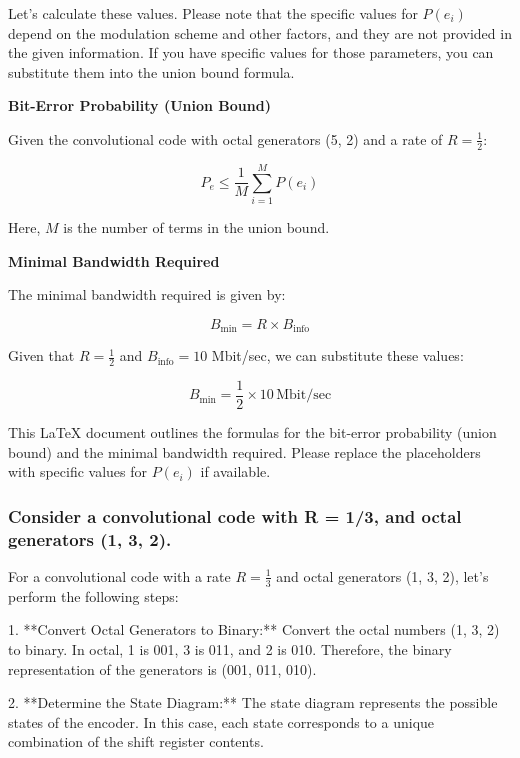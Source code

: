 \documentclass[colorlinks,11pt,a4paper,normalphoto,withhyper,ragged2e]{altareport}
\begin{document}
				Let's calculate these values. Please note that the specific values for \(P(e_i)\) depend on the modulation scheme and other factors, and they are not provided in the given information. If you have specific values for those parameters, you can substitute them into the union bound formula.
				
					\textbf{Bit-Error Probability (Union Bound)}
					
					Given the convolutional code with octal generators (5, 2) and a rate of \( R = \frac{1}{2} \):
					
					\[
					P_e \leq \frac{1}{M} \sum_{i=1}^{M} P(e_i)
					\]
					
					Here, \( M \) is the number of terms in the union bound.
					
					\textbf{Minimal Bandwidth Required}
										
					The minimal bandwidth required is given by:
					
					\[
					B_{\text{min}} = R \times B_{\text{info}}
					\]
					
					Given that \( R = \frac{1}{2} \) and \( B_{\text{info}} = 10 \) Mbit/sec, we can substitute these values:
					
					\[
					B_{\text{min}} = \frac{1}{2} \times 10 \, \text{Mbit/sec}
					\]
				
				This LaTeX document outlines the formulas for the bit-error probability (union bound) and the minimal bandwidth required. Please replace the placeholders with specific values for \(P(e_i)\) if available.
				
				
			
			
			\subsubsection{Consider a convolutional code with R = 1/3, and octal generators (1, 3, 2).}
				
				For a convolutional code with a rate \( R = \frac{1}{3} \) and octal generators (1, 3, 2), let's perform the following steps:
				
				1. **Convert Octal Generators to Binary:**
				Convert the octal numbers (1, 3, 2) to binary. In octal, 1 is 001, 3 is 011, and 2 is 010. Therefore, the binary representation of the generators is (001, 011, 010).
				
				2. **Determine the State Diagram:**
				The state diagram represents the possible states of the encoder. In this case, each state corresponds to a unique combination of the shift register contents.
				
\end{document}
